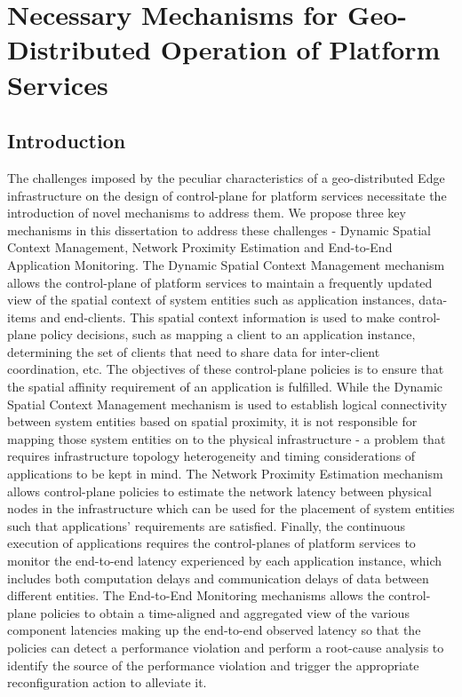\chapter{Necessary Mechanisms for Geo-Distributed Operation of Platform Services}

\section{Introduction}
The challenges imposed by the peculiar characteristics of a geo-distributed Edge infrastructure on the design of  control-plane for platform services necessitate the introduction of novel mechanisms to address them. We propose three key mechanisms in this dissertation to address these challenges - Dynamic Spatial Context Management, Network Proximity Estimation and End-to-End Application Monitoring. The Dynamic Spatial Context Management mechanism allows the control-plane of platform services to maintain a frequently updated view of the spatial context of system entities such as application instances, data-items and end-clients. This spatial context information is used to make control-plane policy decisions, such as mapping a client to an application instance, determining the set of clients that need to share data for inter-client coordination, etc. The objectives of these control-plane policies is to ensure that the spatial affinity requirement of an application is fulfilled. While the Dynamic Spatial Context Management mechanism is used to establish logical connectivity between system entities based on spatial proximity, it is not responsible for mapping those system entities on to the physical infrastructure - a problem that requires infrastructure topology heterogeneity and timing considerations of applications to be kept in mind. 
The Network Proximity Estimation mechanism allows control-plane policies to estimate the network latency between physical nodes in the infrastructure which can be used for the placement of system entities such that applications' requirements are satisfied. Finally, the continuous execution of applications requires the control-planes of platform services to monitor the end-to-end latency experienced by each application instance, which includes both computation delays and communication delays of data between different entities. The End-to-End Monitoring mechanisms allows the control-plane policies to obtain a time-aligned and aggregated view of the various component latencies making up the end-to-end observed latency so that the policies can detect a performance violation and perform a root-cause analysis to identify the source of the performance violation and trigger the appropriate reconfiguration action to alleviate it. 
